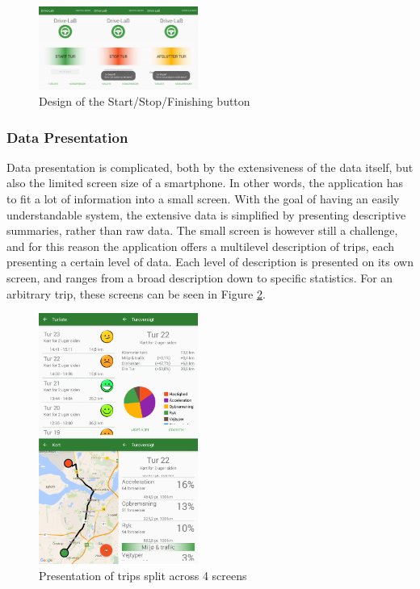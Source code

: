 \begin{figure}[tb]
\centering
\includegraphics[width=0.465\textwidth]{Pictures/start_stop_finishing_trip}
\caption{Design of the Start/Stop/Finishing button}
\label{fig:start_stop_finishing_trip}
\end{figure}

\subsubsection{Data Presentation} \label{subsubsec:design_datapresentation}
Data presentation is complicated, both by the extensiveness of the data itself, but also the limited screen size of a smartphone. In other words, the application has to fit a lot of information into a small screen. With the goal of having an easily understandable system, the extensive data is simplified by presenting descriptive summaries, rather than raw data. The small screen is however still a challenge, and for this reason the application offers a multilevel description of trips, each presenting a certain level of data. Each level of description is presented on its own screen, and ranges from a broad description down to specific statistics. For an arbitrary trip, these screens can be seen in Figure \ref{fig:tripoverview}.

\begin{figure}[tb]
\centering
\includegraphics[width=0.465\textwidth]{Pictures/tripoverview}
\caption{Presentation of trips split across 4 screens}
\label{fig:tripoverview}
\end{figure}

